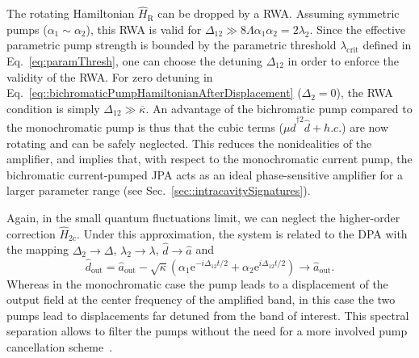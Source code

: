 \documentclass[pra,twocolumn,superscriptaddress]{revtex4-1}
\newcommand{\ah}[0]{\hat{a}}
\newcommand{\dhat}[0]{\hat{d}}
\newcommand{\lcrit}[0]{\lambda_{\mathrm{crit}}}
\newcommand{\Dtdp}[0]{\Delta_{\mathrm{2}}}
\newcommand{\ldp}[0]{\lambda_{\mathrm{2}}}
\newcommand{\corrDoublePump}[0]{\hat{H}_{\mathrm{2c}}}
\newcommand{\kappaTot}[0]{\overline{\kappa}}
\newcommand{\aout}[0]{\hat{a}_{\mathrm{out}}}
\newcommand{\dout}[0]{\hat{d}_{\mathrm{out}}}
\newcommand{\erm}[0]{\mathrm{e}}
\begin{document}
The rotating Hamiltonian $\hat{H}_{\mathrm{R}}$ can be dropped by a RWA. 
Assuming symmetric pumps ($\alpha_1 \sim \alpha_2$), this RWA is valid for 
$\Delta_{12} \gg 8 \Lambda \alpha_1 \alpha_2 = 2\ldp$. 
Since the effective parametric pump strength is bounded by the parametric threshold $\lcrit$ defined in Eq.~\eqref{eq:paramThresh},
one can choose the detuning $\Delta_{12}$ in order to enforce the validity of the RWA.
For zero detuning in Eq.~\eqref{eq::bichromaticPumpHamiltonianAfterDisplacement} ($\Delta_2 = 0$), the RWA condition is simply $\Delta_{12} \gg \kappaTot$.
% 
An advantage of the bichromatic pump compared to the monochromatic pump is thus that the cubic terms ($\mu \dhat^{\dagger 2}\dhat  + h.c.$) are now rotating and can be safely neglected.
% 
This reduces the nonidealities of the amplifier, and implies that, with respect to the monochromatic current pump, the bichromatic current-pumped JPA acts as an ideal phase-sensitive amplifier for a larger parameter range (see Sec.~\ref{sec::intracavitySignatures}).
% 

Again, in the small quantum fluctuations limit, we can neglect the higher-order correction $\corrDoublePump$. Under this approximation, the system is related to the DPA with the mapping $ \Dtdp \rightarrow \Delta$, $\ldp \rightarrow \lambda $, $\dhat \rightarrow \ah$ and
\begin{equation}
	\dout = \aout - \sqrt{\kappa} (\alpha_1 \erm^{-i \Delta_{12}t/2}+\alpha_2 \erm^{i \Delta_{12}t/2}) \rightarrow \aout.
\end{equation}
Whereas in the monochromatic case the pump leads to a displacement of the output field at the center frequency of the amplified band, 
in this case the two pumps lead to displacements far detuned from the band of interest. 
This spectral separation allows to filter the pumps without the need for a more involved pump cancellation scheme~\cite{Eichler:2013kx}.
\end{document}
